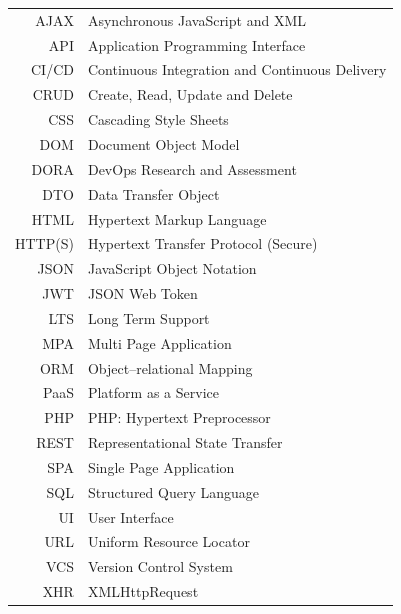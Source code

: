 \documentclass[czech,master,unicode,twoside]{ctufit-thesis}
\begin{document}
\begin{tabular}{rl}
AJAX & Asynchronous JavaScript and XML\\
API & Application Programming Interface\\
CI/CD & Continuous Integration and Continuous Delivery\\
CRUD & Create, Read, Update and Delete\\
CSS & Cascading Style Sheets\\
DOM & Document Object Model\\
DORA & DevOps Research and Assessment\\
DTO & Data Transfer Object\\
HTML & Hypertext Markup Language\\
HTTP(S) & Hypertext Transfer Protocol (Secure)\\
JSON & JavaScript Object Notation\\
JWT & JSON Web Token\\
LTS & Long Term Support\\
MPA & Multi Page Application\\
ORM & Object–relational Mapping\\
PaaS & Platform as a Service\\
PHP & PHP: Hypertext Preprocessor\\
REST & Representational State Transfer\\
SPA & Single Page Application\\
SQL & Structured Query Language\\
UI & User Interface\\
URL & Uniform Resource Locator\\
VCS & Version Control System\\
XHR & XMLHttpRequest
\end{tabular}
\resumeTOCentries
\mainmatter\mainmatterinit %









\appendix\appendixinit %


\backmatter %

\printbibliography %

\end{document}
